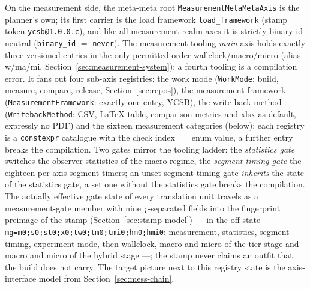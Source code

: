 \begin{nurkurz}
On the measurement side, the meta-meta root \texttt{MeasurementMetaMetaAxis} is the planner's own;
its first carrier is the load framework \texttt{load\_framework} (stamp token \texttt{ycsb@1.0.0.c}),
and like all measurement-realm axes it is strictly binary-id-neutral (\texttt{binary\_id} $=$
\texttt{never}). The measurement-tooling \emph{main} axis holds exactly three versioned entries in the
only permitted order wallclock/macro/micro (alias w/ma/mi, Section~\ref{sec:measurement-system}); a
fourth tooling is a compilation error. It fans out four sub-axis registries: the work mode
(\texttt{WorkMode}: build, measure, compare, release, Section~\ref{sec:repos}), the measurement
framework (\texttt{MeasurementFramework}: exactly one entry, YCSB), the write-back method
(\texttt{WritebackMethod}: CSV, LaTeX table, comparison metrics and xlsx as default, expressly no PDF)
and the sixteen measurement categories (below); each registry is a \texttt{constexpr} catalogue with
the check index $=$ enum value, a further entry breaks the compilation. Two gates mirror the tooling
ladder: the \emph{statistics gate} switches the observer statistics of the macro regime, the
\emph{segment-timing gate} the eighteen per-axis segment timers; an unset segment-timing gate
\emph{inherits} the state of the statistics gate, a set one without the statistics gate breaks the
compilation. The actually effective gate state of every translation unit travels as a measurement-gate
member with nine \texttt{;}-separated fields into the fingerprint preimage of the stamp
(Section~\ref{sec:stamp-model}) --- in the off state \texttt{mg=m0;s0;st0;x0;tw0;tm0;tmi0;hm0;hmi0}:
measurement, statistics, segment timing, experiment mode, then wallclock, macro and micro of the tier
stage and macro and micro of the hybrid stage ---; the stamp never claims an outfit that the build does
not carry. The target picture next to this registry state is the axis-interface model from
Section~\ref{sec:mess-chain}.
\end{nurkurz}

